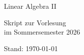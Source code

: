 


\begin{titlepage}
\begin{center}
\vspace*{4cm}
\Huge
{ Linear Algebra II}
\vspace*{2cm}
\huge

Skript zur Vorlesung \\im Sommersemester 2026




\vspace*{11cm}

	\Large Stand: \today
\end{center}
\end{titlepage}
